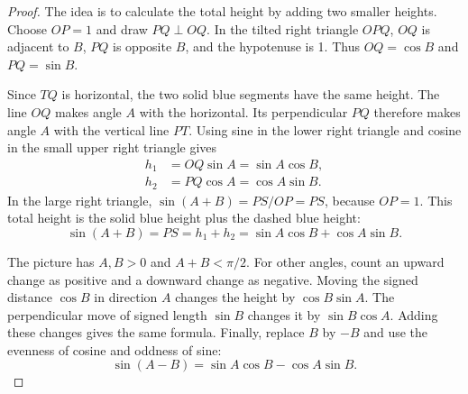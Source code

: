 \begin{proof}
The idea is to calculate the total height by adding two smaller heights.
Choose $OP=1$ and draw $PQ\perp OQ$. In the tilted right triangle $OPQ$,
$OQ$ is adjacent to $B$, $PQ$ is opposite $B$, and the hypotenuse is 1.
Thus $OQ=\cos B$ and $PQ=\sin B$.
\begin{center}
\end{center}
Since $TQ$ is horizontal, the two solid blue segments have the same height.
The line $OQ$ makes angle $A$ with the horizontal. Its perpendicular
$PQ$ therefore makes angle $A$ with the vertical line $PT$.
Using sine in the lower right triangle and cosine in the small upper
right triangle gives
\begin{align*}
h_1&=OQ\sin A=\sin A\cos B,\\
h_2&=PQ\cos A=\cos A\sin B.
\end{align*}
In the large right triangle, $\sin(A+B)=PS/OP=PS$, because $OP=1$.
This total height is the solid blue height plus the dashed blue height:
$$\sin(A+B)=PS=h_1+h_2=\sin A\cos B+\cos A\sin B.$$

The picture has $A,B>0$ and $A+B<\pi/2$. For other angles, count an
upward change as positive and a downward change as negative. Moving
the signed distance $\cos B$ in direction $A$ changes the height by
$\cos B\sin A$. The perpendicular move of signed length $\sin B$ changes
it by $\sin B\cos A$. Adding these changes gives the same formula.
Finally, replace $B$ by $-B$ and use the evenness of cosine and oddness
of sine:
$$\sin(A-B)=\sin A\cos B-\cos A\sin B.$$
\end{proof}

